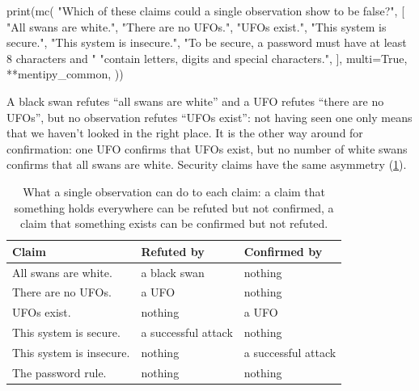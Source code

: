 \begin{frame}[fragile]
  \begin{pycode}
print(mc(
    "Which of these claims could a single observation show to be false?",
    [
        "All swans are white.",
        "There are no UFOs.",
        "UFOs exist.",
        "This system is secure.",
        "This system is insecure.",
        "To be secure, a password must have at least 8 characters and "
        "contain letters, digits and special characters.",
    ],
    multi=True,
    **mentipy_common,
))
  \end{pycode}
\end{frame}


A black swan refutes \enquote{all swans are white} and a UFO refutes
\enquote{there are no UFOs}, but no observation refutes \enquote{UFOs exist}:
not having seen one only means that we haven't looked in the right place.
It is the other way around for confirmation: one UFO confirms that UFOs exist,
but no number of white swans confirms that all swans are white.
Security claims have the same asymmetry (\cref{tab:refute-confirm}).

\begin{frame}
  \begin{table}
    \footnotesize
    \begin{tabular}{lll}
      \toprule
      Claim & Refuted by & Confirmed by \\
      \midrule
      All swans are white. & a black swan & nothing \\
      There are no UFOs. & a UFO & nothing \\
      UFOs exist. & nothing & a UFO \\
      This system is secure. & a successful attack & nothing \\
      This system is insecure. & nothing & a successful attack \\
      The password rule. & nothing & nothing \\
      \bottomrule
    \end{tabular}
    \caption{What a single observation can do to each claim: a claim that
      something holds everywhere can be refuted but not confirmed, a claim
      that something exists can be confirmed but not refuted.}
    \label{tab:refute-confirm}
  \end{table}
\end{frame}

